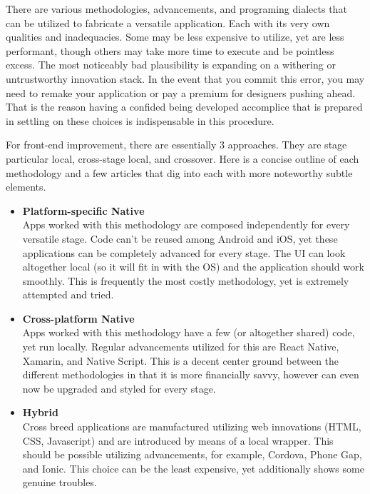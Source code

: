 There are various methodologies, advancements, and programing dialects that can be utilized to fabricate a versatile application. Each with its very own qualities and inadequacies. Some may be less expensive to utilize, yet are less performant, though others may take more time to execute and be pointless excess. The most noticeably bad plausibility is expanding on a withering or untrustworthy innovation stack. In the event that you commit this error, you may need to remake your application or pay a premium for designers pushing ahead. That is the reason having a confided being developed accomplice that is prepared in settling on these choices is indispensable in this procedure.

For front-end improvement, there are essentially 3 approaches. They are stage particular local, cross-stage local, and crossover. Here is a concise outline of each methodology and a few articles that dig into each with more noteworthy subtle elements.


\begin{itemize}
  \item \textbf{Platform-specific Native} \\ 
  Apps worked with this methodology are composed independently for every versatile stage. Code can't be reused among Android and iOS, yet these applications can be completely advanced for every stage. The UI can look altogether local (so it will fit in with the OS) and the application should work smoothly. This is frequently the most costly methodology, yet is extremely attempted and tried.
  
  \item \textbf{Cross-platform Native} \\ 
  Apps worked with this methodology have a few (or altogether shared) code, yet run locally. Regular advancements utilized for this are React Native, Xamarin, and Native Script. This is a decent center ground between the different methodologies in that it is more financially savvy, however can even now be upgraded and styled for every stage.
  
  \item \textbf{Hybrid} \\
 Cross breed applications are manufactured utilizing web innovations (HTML, CSS, Javascript) and are introduced by means of a local wrapper. This should be possible utilizing advancements, for example, Cordova, Phone Gap, and Ionic. This choice can be the least expensive, yet additionally shows some genuine troubles.
\end{itemize}

